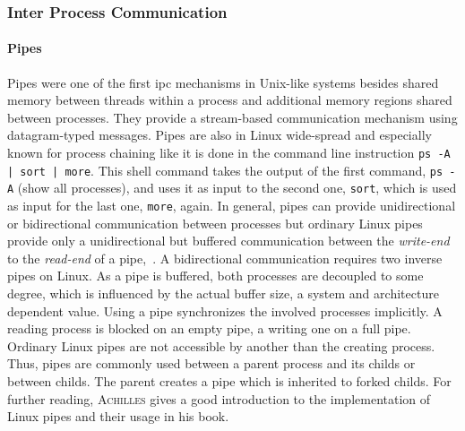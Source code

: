 \subsubsection*{Inter Process Communication}
\paragraph{Pipes}
Pipes were one of the first \ac{ipc} mechanisms in Unix-like systems besides shared memory between threads within a process and additional memory regions shared between processes.
They provide a stream-based communication mechanism using datagram-typed messages.
Pipes are also in Linux wide-spread and especially known for process chaining like it is done in the command line instruction \texttt{ps -A | sort | more}.
This shell command takes the output of the first command, \texttt{ps -A} (show all processes), and uses it as input to the second one, \texttt{sort}, which is used as input for the last one, \texttt{more}, again.
In general, pipes can provide unidirectional or bidirectional communication between processes but ordinary Linux pipes provide only a unidirectional but buffered communication between the \textit{write-end} to the \textit{read-end} of a pipe\cite{glatz2015betriebssysteme},~\cite{silberschatz2009operating}.
A bidirectional communication requires two inverse pipes on Linux\cite{silberschatz2009operating}.
As a pipe is buffered, both processes are decoupled to some degree, which is influenced by the actual buffer size, a system and architecture dependent value.
Using a pipe synchronizes the involved processes implicitly.
A reading process is blocked on an empty pipe, a writing one on a full pipe\cite{glatz2015betriebssysteme}.
Ordinary Linux pipes are not accessible by another than the creating process.
Thus, pipes are commonly used between a parent process and its childs or between childs.
The parent creates a pipe which is inherited to forked childs\cite{silberschatz2009operating}.
For further reading, \textsc{Achilles} gives a good introduction to the implementation of Linux pipes and their usage in his book\cite{achilles2006betriebssysteme}. 

